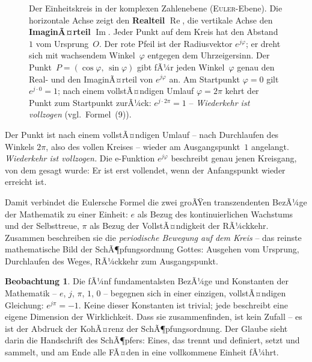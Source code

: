 ﻿\documentclass[a4paper,12pt]{article}
\theoremstyle{definition}
\newtheorem{observation}{Beobachtung}[section]
\begin{document}
\begin{figure}[ht]
\begin{tikzpicture}[scale=2.8, >=Stealth]
\end{tikzpicture}
\caption{%
  Der Einheitskreis in der komplexen Zahlenebene (\textsc{Euler}-Ebene).
  Die horizontale Achse zeigt den \textbf{Realteil} $\operatorname{Re}$,
  die vertikale Achse den \textbf{ImaginÃ¤rteil} $\operatorname{Im}$.
  Jeder Punkt auf dem Kreis hat den Abstand~$1$ vom Ursprung~$O$.
  Der rote Pfeil ist der Radiusvektor $e^{j\varphi}$; er dreht sich
  mit wachsendem Winkel~$\varphi$ entgegen dem Uhrzeigersinn.
  Der Punkt~$P = (\cos\varphi,\, \sin\varphi)$ gibt fÃ¼r jeden Winkel~$\varphi$
  genau den Real- und den ImaginÃ¤rteil von $e^{j\varphi}$ an.
  Am Startpunkt $\varphi = 0$ gilt $e^{j\cdot 0} = 1$;
  nach einem vollstÃ¤ndigen Umlauf $\varphi = 2\pi$ kehrt der Punkt
  zum Startpunkt zurÃ¼ck: $e^{j\cdot 2\pi} = 1$
  -- \textit{Wiederkehr ist vollzogen} (vgl.~Formel~(9)).
}
\label{fig:einheitskreis}
\end{figure}

Der Punkt ist nach einem vollstÃ¤ndigen Umlauf -- nach Durchlaufen des Winkels
$2\pi$, also des vollen Kreises -- wieder am Ausgangspunkt~$1$ angelangt.
\textit{Wiederkehr ist vollzogen.} Die e-Funktion $e^{j\varphi}$
beschreibt genau jenen Kreisgang, von dem gesagt wurde: Er ist erst vollendet,
wenn der Anfangspunkt wieder erreicht ist.

Damit verbindet die Eulersche Formel die zwei groÃŸen transzendenten BezÃ¼ge der
Mathematik zu einer Einheit: $e$ als Bezug des kontinuierlichen Wachstums und
der Selbsttreue, $\pi$ als Bezug der VollstÃ¤ndigkeit der RÃ¼ckkehr. Zusammen
beschreiben sie die \textit{periodische Bewegung auf dem Kreis} -- das reinste
mathematische Bild der SchÃ¶pfungsordnung Gottes: Ausgehen vom Ursprung,
Durchlaufen des Weges, RÃ¼ckkehr zum Ausgangspunkt.

\begin{observation}
	Die fÃ¼nf fundamentalsten BezÃ¼ge und Konstanten der Mathematik -- $e$, $j$, $\pi$, $1$,
	$0$ -- begegnen sich in einer einzigen, vollstÃ¤ndigen Gleichung: $e^{j\pi} = -1$. Keine dieser Konstanten ist trivial; jede beschreibt eine eigene
	Dimension der Wirklichkeit. Dass sie zusammenfinden, ist kein Zufall -- es
	ist der Abdruck der KohÃ¤renz der SchÃ¶pfungsordnung. Der Glaube sieht darin
	die Handschrift des SchÃ¶pfers: Eines, das trennt und definiert, setzt und
	sammelt, und am Ende alle FÃ¤den in eine vollkommene Einheit fÃ¼hrt.
\end{observation}
\end{document}
